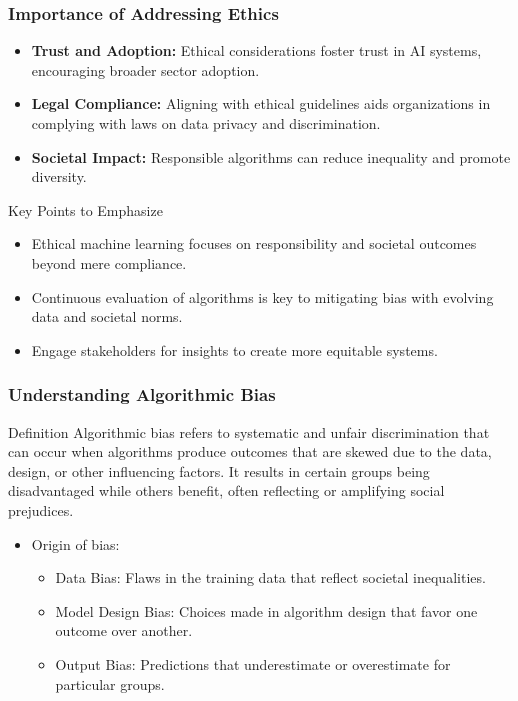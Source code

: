 \documentclass[aspectratio=169]{beamer}
\begin{document}
\begin{frame}[fragile]
    \frametitle{Importance of Addressing Ethics}
    \begin{itemize}
        \item \textbf{Trust and Adoption:} Ethical considerations foster trust in AI systems, encouraging broader sector adoption.
        \item \textbf{Legal Compliance:} Aligning with ethical guidelines aids organizations in complying with laws on data privacy and discrimination.
        \item \textbf{Societal Impact:} Responsible algorithms can reduce inequality and promote diversity.
    \end{itemize}
    
    \begin{block}{Key Points to Emphasize}
        \begin{itemize}
            \item Ethical machine learning focuses on responsibility and societal outcomes beyond mere compliance.
            \item Continuous evaluation of algorithms is key to mitigating bias with evolving data and societal norms.
            \item Engage stakeholders for insights to create more equitable systems.
        \end{itemize}
    \end{block}
\end{frame}

\begin{frame}[fragile]
    \frametitle{Understanding Algorithmic Bias}
    \begin{block}{Definition}
        Algorithmic bias refers to systematic and unfair discrimination that can occur when algorithms produce outcomes that are skewed due to the data, design, or other influencing factors. 
        It results in certain groups being disadvantaged while others benefit, often reflecting or amplifying social prejudices.
    \end{block}
    
    \begin{itemize}
        \item Origin of bias:
        \begin{itemize}
            \item Data Bias: Flaws in the training data that reflect societal inequalities.
            \item Model Design Bias: Choices made in algorithm design that favor one outcome over another.
            \item Output Bias: Predictions that underestimate or overestimate for particular groups.
        \end{itemize}
    \end{itemize}
\end{frame}
\end{document}
